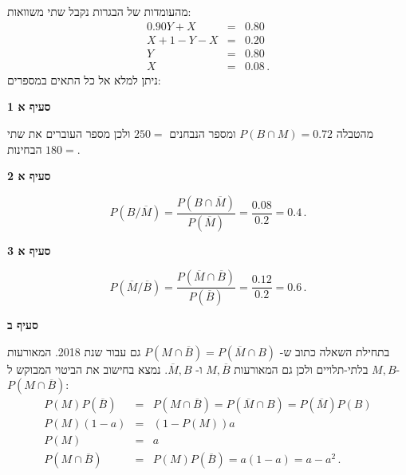 מהעומדות של הבגרות נקבל שתי משוואות:
\begin{eqnarray*}
0.90Y+X&=&0.80\\
X+1-Y-X&=&0.20\\
Y&=&0.80\\
X&=&0.08\,.
\end{eqnarray*}
ניתן למלא אל כל התאים במספרים:
\begin{center}
\end{center}

\textbf{סעיף א 1}

מהטבלה
$P(B\cap M)=0.72$
ומספר הנבחנים
$250=$
ולכן מספר העוברים את שתי הבחינות
$180=$.

\textbf{סעיף א 2}

\[
P(B/\overline{M})=\frac{P(B\cap\overline{M})}{P(\overline{M})}=
\frac{0.08}{0.2}=0.4\,.
\]

\textbf{סעיף א 3}

\[
P(\overline{M}/\overline{B})=\frac{P(\overline{M}\cap \overline{B})}{P(\overline{B})}=\frac{0.12}{0.2}=0.6\,.
\]

\textbf{סעיף ב}

בתחילת השאלה כתוב ש-%
$P(M\cap\overline{B})=P(\overline{M}\cap B)$
גם עבור שנת 2018. המאורעות
$M,B$
בלתי-תלויים ולכן גם המאורעות
$M,\overline{B}$
ו-%
$\overline{M},B$.
נמצא בחישוב את הביטוי המבוקש ל-%
$P(M\cap\overline{B})$:
\begin{eqnarray*}
P(M) P(\overline{B})&=&P(M\cap\overline{B})=
P(\overline{M}\cap B)=P(\overline{M})P(B)\\
P(M)(1-a)&=&(1-P(M))a\\
P(M)&=&a\\
P(M\cap\overline{B})&=&P(M)P(\overline{B})=a(1-a)=a-a^2\,.
\end{eqnarray*}
